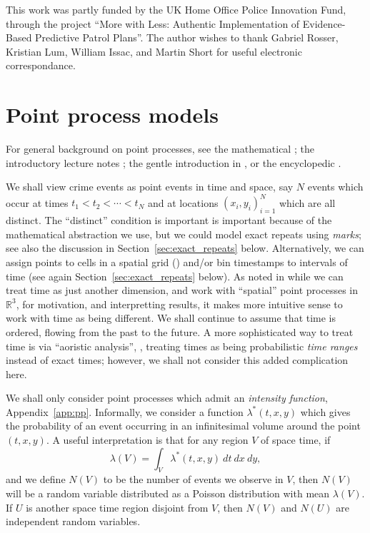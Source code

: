\documentclass[twoside,a4paper]{article}
\theoremstyle{plain}
\theoremstyle{definition}
\begin{document}
This work was partly funded by the UK Home Office Police Innovation Fund, through the
project ``More with Less: Authentic Implementation of Evidence-Based Predictive
Patrol Plans''.  The author wishes to thank Gabriel Rosser, Kristian Lum, William Issac,
and Martin Short for useful electronic correspondance.



\section{Point process models}

For general background on point processes, see the mathematical \cite{dvj}; the
introductory lecture notes \cite{ras}; the gentle introduction in \cite[Chapter~8]{rip},
or the encyclopedic \cite{handbookss}.

We shall view crime events as point events in time and space, say $N$ events which occur
at times $t_1 < t_2 < \cdots < t_N$ and at locations $(x_i, y_i)_{i=1}^N$ which are all
distinct.  The ``distinct'' condition is important is important because of the
mathematical abstraction we use, but we could model exact repeats using \emph{marks};
see also the discussion in Section~\ref{sec:exact_repeats} below.
Alternatively, we can assign points to cells in a spatial grid
(\cite{sepp2}) and/or bin timestamps to intervals of time (see again
Section~\ref{sec:exact_repeats} below).
As noted in \cite[Part~V]{handbookss} while we can treat time as just another dimension,
and work with ``spatial'' point processes in $\mathbb R^3$, for motivation, and interpretting
results, it makes more intuitive sense to work with time as being different.  We shall
continue to assume that time is ordered, flowing from the past to the future.
A more sophisticated way to treat time is via ``aoristic analysis'', \cite{ratcliffe},
treating times as being probabilistic \emph{time ranges} instead of exact times; however,
we shall not consider this added complication here.

We shall only consider point processes which admit an \emph{intensity function},
Appendix~\ref{app:pp}.  Informally, we consider a function $\lambda^*(t,x,y)$ which gives
the probability of an event occurring in an infinitesimal volume around the point $(t,x,y)$.
A useful interpretation is that for any region $V$ of space time, if
\begin{equation}
\lambda(V) = \int_V \lambda^*(t,x,y) \ dt \ dx \ dy,
\label{eq:exp_poisson}
\end{equation}
and we define $N(V)$ to be the number of events we observe in $V$, then $N(V)$ will be a
random variable distributed as a Poisson distribution with mean $\lambda(V)$.  If $U$ is
another space time region disjoint from $V$, then $N(V)$ and $N(U)$ are independent random
variables.
\end{document}

